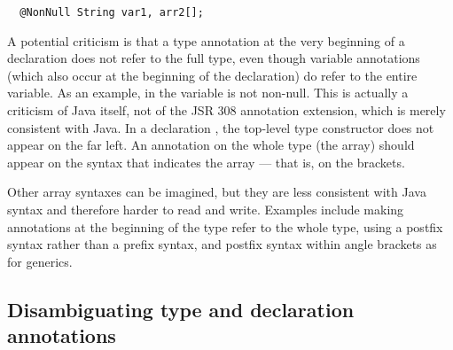 \documentclass[10pt]{article}
\begin{document}
\begin{Verbatim}
  @NonNull String var1, arr2[];
\end{Verbatim}

% 




A potential criticism is that a type annotation at the very beginning of a
declaration does not refer to the full type, even though variable
annotations (which also occur at the beginning of
the declaration) do refer to the entire variable.  As an example, in
 the variable  is not non-null.
This is actually a criticism of Java itself, not of the JSR 308
annotation extension, which is merely consistent with Java.  In a
declaration , the top-level type constructor does not
appear on the far left.  An annotation on the whole type (the array) should
appear on the syntax that indicates the array --- that is, on the brackets.


Other array syntaxes can be imagined, but they are less consistent with
Java syntax and therefore harder to read and write.
Examples include
making annotations at the beginning of the type refer to the whole type,
using a postfix syntax rather than a prefix syntax, and postfix syntax
within angle brackets as for generics.



\subsection{Disambiguating type and declaration annotations\label{disambiguating}}
\end{document}
